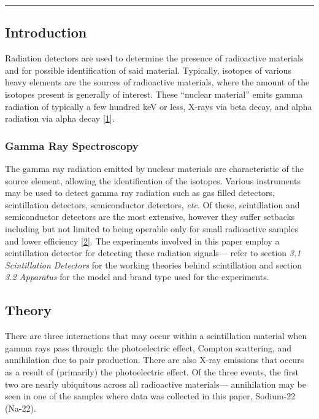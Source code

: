 \documentclass[12pt]{article}
\begin{document}
\noindent\rule{\linewidth}{0.5pt}

\begin{multicols}{2}

\subsection{Introduction}
Radiation detectors are used to determine the presence of radioactive materials
and for possible identification of said material. Typically, isotopes of various 
heavy elements are the sources of radioactive materials, where the amount of
the isotopes present is generally of interest. These ``nuclear material''
emits gamma radiation of typically a few hundred keV or less, X-rays via
beta decay, and alpha radiation via alpha decay [\hyperref[sec:1]{1}].
\vfill

\subsubsection{Gamma Ray Spectroscopy}
The gamma ray radiation emitted by nuclear materials are characteristic of the
source element, allowing the identification of the isotopes. Various instruments
may be used to detect gamma ray radiation such as gas filled detectors, 
scintillation detectors, semiconductor detectors, \textit{etc}. Of these,
scintillation and semiconductor detectors are the most extensive, however 
they suffer setbacks including but not limited to being operable only for 
small radioactive samples and lower efficiency [\hyperref[sec:2]{2}]. 
The experiments involved in this paper employ a scintillation detector
for detecting these radiation signals---
refer to section \textit{3.1 Scintillation Detectors} for the working
theories behind scintillation and section \textit{3.2 Apparatus} for
the model and brand type used for the experiments.

\subsection{Theory}

There are three interactions that may occur 
within a scintillation material when gamma rays pass 
through: the photoelectric effect, Compton scattering,
and annihilation due to pair production.
There are also X-ray emissions that occurs as a result
of (primarily) the photoelectric effect.
Of the three events, the first two are nearly ubiquitous
across all radioactive materials---
annihilation may be seen in one of the samples where
data was collected in this paper, Sodium-22 (Na-22).


\end{multicols}
\end{document}
